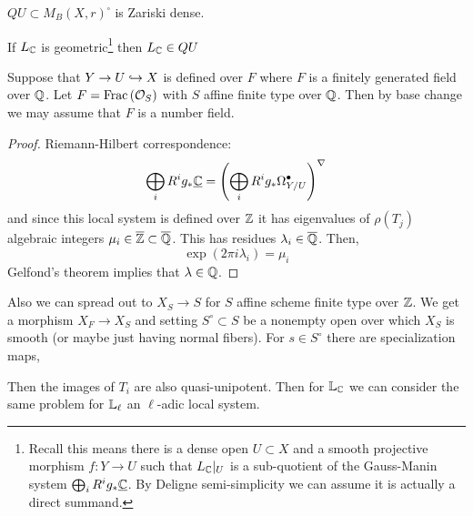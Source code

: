 \documentclass[12pt]{article}
\begin{document}
\begin{theorem}[E-Kerz, 20] 
$QU \subset M_B(X, r)^{\square}$ is Zariski dense. 
\end{theorem}

\begin{theorem}[Grothendieck]
If $L_{\mathbb{C}}$ is geometric\footnote{Recall this means there is a dense open $U \subset X$ and a smooth projective morphism $f : Y \to U$ such that $L_{\mathbb{C}}|_U$ is a sub-quotient of the Gauss-Manin system $\bigoplus_{i} R^i g_* \underline{\mathbb{C}}$. By Deligne semi-simplicity we can assume it is actually a direct summand.} then $L_{\mathbb{C}} \in QU$
\end{theorem}

\begin{theorem}[Brieskorn]
Suppose that $Y \to U \hookrightarrow X$ is defined over $F$ where $F$ is a finitely generated field over $\mathbb{Q}$. Let $F = \mathrm{Frac}\left(\mathcal{O}_{S}\right)$ with $S$ affine finite type over $\mathbb{Q}$. Then by base change we may assume that $F$ is a number field. 
\end{theorem}

\begin{proof}
Riemann-Hilbert correspondence:
\[ \bigoplus_{i} R^i g_* \underline{\mathbb{C}}  = \left( \bigoplus_{i} R^i g_* \Omega^\bullet_{Y/U} \right)^{\nabla} \]
and since this local system is defined over $\mathbb{Z}$ it has eigenvalues of $\rho(T_j)$ algebraic integers $\mu_i \in \overline{\mathbb{Z}} \subset \overline{\mathbb{Q}}$. This has residues $\lambda_i \in \overline{\mathbb{Q}}$. Then,
\[ \exp(2 \pi i \lambda_i) = \mu_i \] 
Gelfond's theorem implies that $\lambda \in \mathbb{Q}$. 
\end{proof}

Also we can spread out to $X_S \to S$ for $S$ affine scheme finite type over $\mathbb{Z}$. We get a morphism $X_F \to X_S$ and setting $S^\circ \subset S$ be a nonempty open over which $X_S$ is smooth (or maybe just having normal fibers). For $s \in S^\circ$ there are specialization maps,
\begin{center}
\end{center}
Then the images of $T_i$ are also quasi-unipotent. Then for $\mathbb{L}_{\mathbb{C}}$ we can consider the same problem for $\mathbb{L}_{\ell}$ an $\ell$-adic local system.
\end{document}
